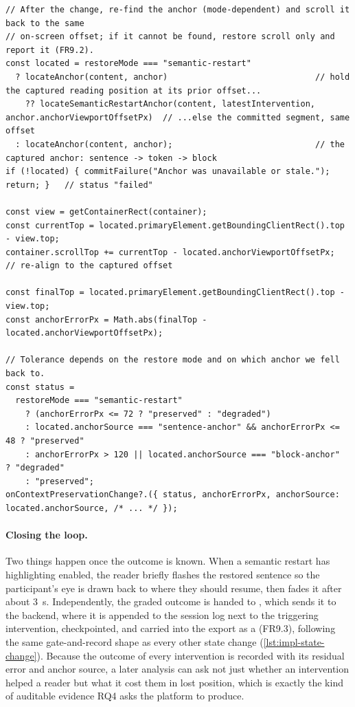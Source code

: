 \begin{listing}[htbp]
\begin{verbatim}
// After the change, re-find the anchor (mode-dependent) and scroll it back to the same
// on-screen offset; if it cannot be found, restore scroll only and report it (FR9.2).
const located = restoreMode === "semantic-restart"
  ? locateAnchor(content, anchor)                              // hold the captured reading position at its prior offset...
    ?? locateSemanticRestartAnchor(content, latestIntervention, anchor.anchorViewportOffsetPx)  // ...else the committed segment, same offset
  : locateAnchor(content, anchor);                             // the captured anchor: sentence -> token -> block
if (!located) { commitFailure("Anchor was unavailable or stale."); return; }   // status "failed"

const view = getContainerRect(container);
const currentTop = located.primaryElement.getBoundingClientRect().top - view.top;
container.scrollTop += currentTop - located.anchorViewportOffsetPx;    // re-align to the captured offset

const finalTop = located.primaryElement.getBoundingClientRect().top - view.top;
const anchorErrorPx = Math.abs(finalTop - located.anchorViewportOffsetPx);

// Tolerance depends on the restore mode and on which anchor we fell back to.
const status =
  restoreMode === "semantic-restart"
    ? (anchorErrorPx <= 72 ? "preserved" : "degraded")
    : located.anchorSource === "sentence-anchor" && anchorErrorPx <= 48 ? "preserved"
    : anchorErrorPx > 120 || located.anchorSource === "block-anchor"    ? "degraded"
    : "preserved";
onContextPreservationChange?.({ status, anchorErrorPx, anchorSource: located.anchorSource, /* ... */ });
\end{verbatim}
\caption{Restoring the reading anchor (abbreviated from \texttt{usePreserveReadingContext.ts}): scroll to the captured offset, measure residual \texttt{anchorErrorPx}, and report the graded outcome to the session log.}
\label{lst:impl-anchor-restore}
\end{listing}

\paragraph{Closing the loop.}
Two things happen once the outcome is known.
When a semantic restart has highlighting enabled, the reader briefly flashes the restored sentence so the participant's eye is drawn back to where they should resume, then fades it after about \SI{3}{\second}.
Independently, the graded outcome is handed to , which sends it to the backend, where it is appended to the session log next to the triggering intervention, checkpointed, and carried into the export as a  (FR9.3), following the same gate-and-record shape as every other state change (\cref{lst:impl-state-change}).
Because the outcome of every intervention is recorded with its residual error and anchor source, a later analysis can ask not just whether an intervention helped a reader but what it cost them in lost position, which is exactly the kind of auditable evidence RQ4 asks the platform to produce.

